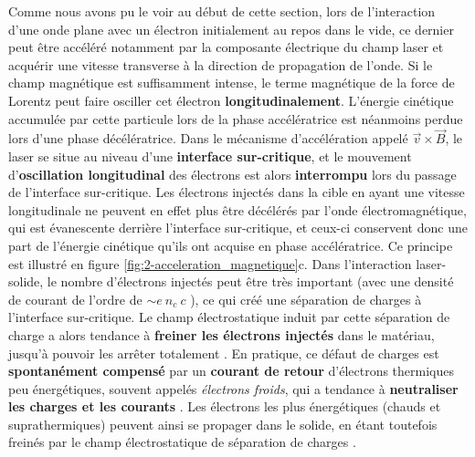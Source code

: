 \begin{refsection}
Comme nous avons pu le voir au début de cette section, lors de l'interaction d'une onde plane avec un électron initialement au repos dans le vide, ce dernier peut être accéléré notamment par la composante électrique du champ laser et acquérir une vitesse transverse à la direction de propagation de l'onde. Si le champ magnétique est suffisamment intense, le terme magnétique de la force de Lorentz peut faire osciller cet électron \textbf{longitudinalement}. L'énergie cinétique accumulée par cette particule lors de la phase accélératrice est néanmoins perdue lors d'une phase décélératrice. Dans le mécanisme d'accélération appelé $\vec{v} \times \vec{B}$, le laser se situe au niveau d'une \textbf{interface sur-critique}, et le mouvement d'\textbf{oscillation longitudinal} des électrons est alors \textbf{interrompu} lors du passage de l'interface sur-critique. Les électrons injectés dans la cible en ayant une vitesse longitudinale ne peuvent en effet plus être décélérés par l'onde électromagnétique, qui est évanescente derrière l'interface sur-critique, et ceux-ci conservent donc une part de l'énergie cinétique qu'ils ont acquise en phase accélératrice. Ce principe est illustré en figure \ref{fig:2-acceleration_magnetique}c. 
Dans l'interaction laser-solide, le nombre d'électrons injectés peut être très important (avec une densité de courant de l'ordre de $\sim e ~ n_c ~ c$ \parencite{macchi_2012}), ce qui créé une séparation de charges à l'interface sur-critique. Le champ électrostatique induit par cette séparation de charge a alors tendance à \textbf{freiner les électrons injectés} dans le matériau, jusqu'à pouvoir les arrêter totalement \parencite{macchi_2012}. En pratique, ce défaut de charges est \textbf{spontanément compensé} par un \textbf{courant de retour} d'électrons thermiques peu énergétiques, souvent appelés \textit{électrons froids}, qui a tendance à \textbf{neutraliser les charges et les courants} \parencite{macchi_2012, bell_1997}. 
Les électrons les plus énergétiques (chauds et suprathermiques) peuvent ainsi se propager dans le solide, en étant toutefois freinés par le champ électrostatique de séparation de charges \parencite{macchi_2012, bell_1997}.


\end{refsection}
